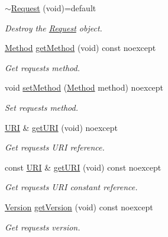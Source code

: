 \begin{DoxyCompactItemize}
\mbox{\hyperlink{classo_z_1_1_h_t_t_p_1_1_request_a2bc2913d79ffe8ce63a19c480b9cf330}{$\sim$\+Request}} (void)=default
\begin{DoxyCompactList}\small\item\em Destroy the \mbox{\hyperlink{classo_z_1_1_h_t_t_p_1_1_request}{Request}} object. \end{DoxyCompactList}\item 
\mbox{\hyperlink{namespaceo_z_1_1_h_t_t_p_a02d8497e4abbb0adf3af0fe9fad1b7a6}{Method}} \mbox{\hyperlink{classo_z_1_1_h_t_t_p_1_1_request_ab8c06f60e7d3b17c2ad03c7b9cb046d7}{get\+Method}} (void) const noexcept
\begin{DoxyCompactList}\small\item\em Get request\textquotesingle{}s method. \end{DoxyCompactList}\item 
void \mbox{\hyperlink{classo_z_1_1_h_t_t_p_1_1_request_a9f3add384eca2de060c2f3c601e7b15e}{set\+Method}} (\mbox{\hyperlink{namespaceo_z_1_1_h_t_t_p_a02d8497e4abbb0adf3af0fe9fad1b7a6}{Method}} method) noexcept
\begin{DoxyCompactList}\small\item\em Set request\textquotesingle{}s method. \end{DoxyCompactList}\item 
\mbox{\hyperlink{namespaceo_z_1_1_h_t_t_p_a6d47156e2eac27750983fc1b54bd2ff8}{U\+RI}} \& \mbox{\hyperlink{classo_z_1_1_h_t_t_p_1_1_request_aaec3f19cb4ee6a18878166049df3253a}{get\+U\+RI}} (void) noexcept
\begin{DoxyCompactList}\small\item\em Get request\textquotesingle{}s U\+RI reference. \end{DoxyCompactList}\item 
const \mbox{\hyperlink{namespaceo_z_1_1_h_t_t_p_a6d47156e2eac27750983fc1b54bd2ff8}{U\+RI}} \& \mbox{\hyperlink{classo_z_1_1_h_t_t_p_1_1_request_afe1db07c464e1b708187108cbef952fa}{get\+U\+RI}} (void) const noexcept
\begin{DoxyCompactList}\small\item\em Get request\textquotesingle{}s U\+RI constant reference. \end{DoxyCompactList}\item 
\mbox{\hyperlink{structo_z_1_1_h_t_t_p_1_1_version}{Version}} \mbox{\hyperlink{classo_z_1_1_h_t_t_p_1_1_request_a9738725e912aad1cdf346b233c49654f}{get\+Version}} (void) const noexcept
\begin{DoxyCompactList}\small\item\em Get request\textquotesingle{}s version. \end{DoxyCompactList}\item 

\end{DoxyCompactItemize}
